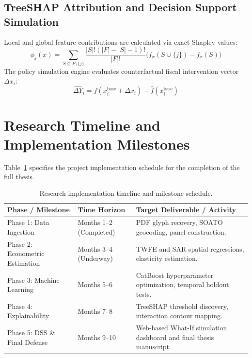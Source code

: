 \documentclass[12pt,letterpaper]{report}
\begin{document}
\subsection{TreeSHAP Attribution and Decision Support Simulation}
Local and global feature contributions are calculated via exact Shapley values:
\begin{equation}
    \phi_j(x) = \sum_{S \subseteq F \setminus \{j\}} \frac{|S|!(|F| - |S| - 1)!}{|F|!} \Big( f_x(S \cup \{j\}) - f_x(S) \Big)
\end{equation}
The policy simulation engine evaluates counterfactual fiscal intervention vector $\Delta x_i$:
\begin{equation}
    \hat{\Delta Y}_i = \hat{f}(x_i^{\text{base}} + \Delta x_i) - \hat{f}(x_i^{\text{base}})
\end{equation}

\section{Research Timeline and Implementation Milestones}
Table~\ref{tab:timeline} specifies the project implementation schedule for the completion of the full thesis.

\begin{table}[htbp]
\centering
\begin{singlespace}
\small
\caption{Research implementation timeline and milestone schedule.}
\label{tab:timeline}
\begin{tabularx}{\textwidth}{l p{4.2cm} X}
\toprule
\textbf{Phase / Milestone} & \textbf{Time Horizon} & \textbf{Target Deliverable / Activity} \\
\midrule
Phase 1: Data Ingestion & Months 1--2 (Completed) & PDF glyph recovery, SOATO geocoding, panel construction. \\
Phase 2: Econometric Estimation & Months 3--4 (Underway) & TWFE and SAR spatial regressions, elasticity estimation. \\
Phase 3: Machine Learning & Months 5--6 & CatBoost hyperparameter optimization, temporal holdout tests. \\
Phase 4: Explainability & Months 7--8 & TreeSHAP threshold discovery, interaction contour mapping. \\
Phase 5: DSS \& Final Defense & Months 9--10 & Web-based What-If simulation dashboard and final thesis manuscript. \\
\bottomrule
\end{tabularx}
\end{singlespace}
\end{table}
\end{document}
